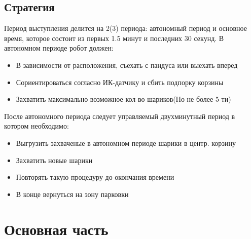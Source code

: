 \documentclass[11pt]{article}
\begin{document}
		\subsection{Стратегия}
			Период выступления делится на 2(3) периода: автономный период и основное время, которое состоит из первых 1.5 минут и последних 30 секунд.
			В автономном периоде робот должен:
			\begin{itemize}
				\item В зависимости от расположения, съехать с пандуса или выехать вперед
				\item Сориентироваться согласно ИК-датчику и сбить подпорку корзины
				\item Захватить максимально возможное кол-во шариков(Но не более 5-ти)
			\end{itemize}
			После автономного периода следует управляемый двухминутный период в котором необходимо:
			\begin{itemize}
				\item Выгрузить захваченые в автономном периоде шарики в центр. корзину
				\item Захватить новые шарики 
				\item Повторять такую процедуру до окончания времени
				\item В конце вернуться на зону парковки
			\end{itemize}
		
	\section{Основная часть}
\end{document}
